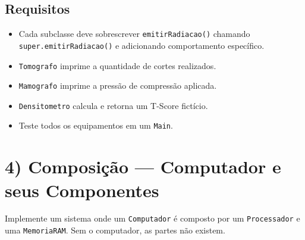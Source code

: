 \documentclass[12pt]{article}
\begin{document}
\subsection*{Requisitos}
\begin{itemize}
    \item Cada subclasse deve sobrescrever \texttt{emitirRadiacao()} chamando \texttt{super.emitirRadiacao()} e adicionando comportamento específico.
    \item \texttt{Tomografo} imprime a quantidade de cortes realizados.
    \item \texttt{Mamografo} imprime a pressão de compressão aplicada.
    \item \texttt{Densitometro} calcula e retorna um T-Score fictício.
    \item Teste todos os equipamentos em um \texttt{Main}.
\end{itemize}

\section*{4) Composição — Computador e seus Componentes}
Implemente um sistema onde um \texttt{Computador} é composto por um \texttt{Processador} e uma \texttt{MemoriaRAM}. Sem o computador, as partes não existem.
\end{document}
